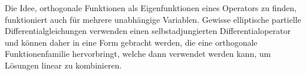 Die Idee, orthogonale Funktionen als Eigenfunktionen eines
Operators zu finden, funktioniert auch für mehrere unabhängige
Variablen.
Gewisse elliptische partielle Differentialgleichungen verwenden einen
selbstadjungierten Differentialoperator und können daher 
in eine Form gebracht werden, die eine orthogonale Funktionenfamilie
hervorbringt, welche dann verwendet werden kann, um Lösungen
linear zu kombinieren.







\uebungsabschnitt

\begin{uebungsaufgaben}
\end{uebungsaufgaben}
\enduebungsabschnitt
